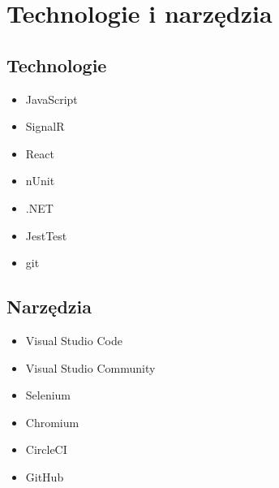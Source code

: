 \documentclass[12pt]{report}
\begin{document}
	\chapter{Technologie i narzędzia}	
		\section{Technologie}
		\begin{itemize}
			\item JavaScript
			\item SignalR
			\item React
			\item nUnit
			\item .NET
			\item JestTest
			\item git
		\end{itemize}
		
		\section{Narzędzia}
		\begin{itemize}
			\item Visual Studio Code
			\item Visual Studio Community
			\item Selenium
			\item Chromium
			\item CircleCI
			\item GitHub
		\end{itemize}
	
\end{document}
